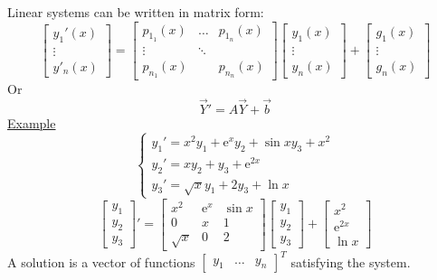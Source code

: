 \documentclass{article}
\newcommand{\mathe}{\mathrm{e}}
\begin{document}
Linear systems can be written in matrix form:
\[ \left[\begin{array}{c}
     y_1' (x)\\
     \vdots\\
     y'_n (x)
   \end{array}\right] = \left[\begin{array}{ccc}
     p_{1_1} (x) & \ldots & p_{1_n} (x)\\
     \vdots & \ddots & \\
     p_{n_1} (x) &  & p_{n_n} (x)
   \end{array}\right] \left[\begin{array}{c}
     y_1 (x)\\
     \vdots\\
     y_n (x)
   \end{array}\right] + \left[\begin{array}{c}
     g_1 (x)\\
     \vdots\\
     g_n (x)
   \end{array}\right] \]
Or
\[ \vec{Y}' = A \vec{Y} + \vec{b} \]
{\underline{Example}}
\[ \left\{\begin{array}{l}
     y_1' = x^2 y_1 + \mathe^x y_2 + \sin xy _3 + x^2\\
     y_2' = xy_2 + y_3 + \mathe^{2 x}\\
     y_3' = \sqrt{x} y_1 + 2 y_3 + \ln x
   \end{array}\right. \]
\[ \left[\begin{array}{c}
     y_1\\
     y_2\\
     y_3
   \end{array}\right]' = \left[\begin{array}{ccc}
     x^2 & \mathe^x & \sin x\\
     0 & x & 1\\
     \sqrt{x} & 0 & 2
   \end{array}\right] \left[\begin{array}{c}
     y_1\\
     y_2\\
     y_3
   \end{array}\right] + \left[\begin{array}{c}
     x^2\\
     \mathe^{2 x}\\
     \ln x
   \end{array}\right] \]
A solution is a vector of functions $\left[\begin{array}{ccc}
  y_1 & \ldots & y_n
\end{array}\right]^T$ satisfying the system.
\end{document}
